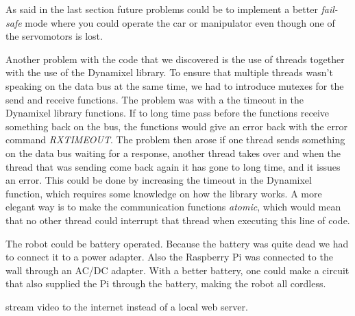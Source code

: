 As said in the last section future problems could be to implement a better \textit{fail-safe} mode where you could operate the car or manipulator even though one of the servomotors is lost.
\bigskip

Another problem with the code that we discovered is the use of threads together with the use of the Dynamixel library. To ensure that multiple threads wasn't speaking on the data bus at the same time, we had to introduce mutexes for the send and receive functions. The problem was with a the timeout in the Dynamixel library functions. If to long time pass before the functions receive something back on the bus, the functions would give an error back with the error command \textit{RXTIMEOUT}. The problem then arose if one thread sends something on the data bus waiting for a response, another thread takes over and when the thread that was sending come back again it has gone to long time, and it issues an error. This could be done by increasing the timeout in the Dynamixel function, which requires some knowledge on how the library works. 
A more elegant way is to make the communication functions \textit{atomic}, which would mean that no other thread could interrupt that thread when executing this line of code. %
\bigskip

The robot could be battery operated. Because the battery was quite dead we had to connect it to a power adapter. Also the Raspberry Pi was connected to the wall through an AC/DC adapter. With a better battery, one could make a circuit that also supplied the Pi through the battery, making the robot all cordless.
\bigskip

stream video to the internet instead of a local web server.


